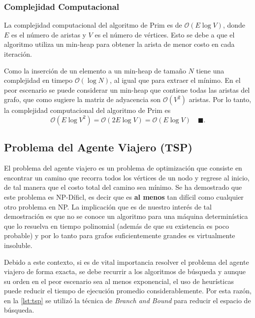 \documentclass[12pt]{article}
\begin{document}
  \subsubsection{Complejidad Computacional}
  La complejidad computacional del algoritmo de Prim es de $\mathcal{O}(E\log V)$, donde $E$ es el número de aristas
  y $V$ es el número de vértices. Esto se debe a que el algoritmo utiliza un min-heap para obtener la arista
  de menor costo en cada iteración. 
  
  Como la inserción de un elemento a un min-heap de tamaño $N$ tiene una complejidad en timepo $\mathcal{O}(\log N)$, al igual que para extraer el mínimo. 
  En el peor escenario se puede considerar un min-heap que contiene todas las aristas del grafo, que como sugiere la matriz de adyacencia
  son $\mathcal{O}(V^2)$ aristas. Por lo tanto, la complejidad computacional del algoritmo de Prim es 
  \begin{equation}
    \mathcal{O}(E\log V^{2}) = \mathcal{O}(2E\log V) = \mathcal{O}(E\log V) \quad \blacksquare.
  \end{equation}

  \subsection{Problema del Agente Viajero (TSP)}

  El problema del agente viajero es un problema de optimización que consiste en encontrar un camino que recorra todos los vértices de un nodo y regrese al inicio,
  de tal manera que el costo total del camino sea mínimo. Se ha demostrado que este problema es NP-Díficl, es decir que es \textbf{al menos} tan difícil como cualquier otro problema en NP.
  La implicación que es de nuestro interés de tal demostración es que no se conoce un algoritmo para una máquina determinística que lo resuelva en tiempo polinomial (además de que su existencia 
  es poco probable) y por lo tanto para grafos suficientemente grandes es virtualmente insoluble.

  Debido a este contexto, si es de vital importancia resolver el problema del agente viajero de forma exacta, se debe recurrir a los algoritmos de búsqueda y aunque su orden en el peor escenario 
  sea al menos exponencial, el uso de heurísticas puede reducir el tiempo de ejecución promedio considerablemente. Por esta razón, en la \autoref{lst:tsp} se utilizó la técnica de
  \textit{Branch and Bound} para reducir el espacio de búsqueda.
\end{document}
